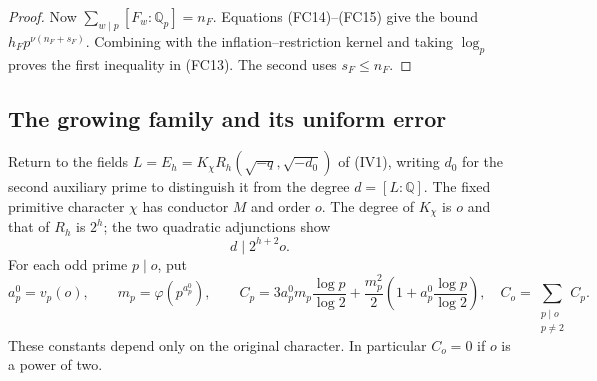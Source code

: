 \begin{proof}
Now $\sum_{w\mid p}[F_w:\mathbb Q_p]=n_F$.
Equations (FC14)--(FC15) give the bound
$h_Fp^{\nu(n_F+s_F)}$. Combining with the
inflation--restriction kernel and taking $\log_p$
proves the first inequality in (FC13).
The second uses $s_F\le n_F$.
\end{proof}

\subsection{The growing family and its uniform error}

Return to the fields
$L=E_h=K_\chi R_h(\sqrt{-q},\sqrt{-d_0})$
of (IV1), writing $d_0$ for the second auxiliary prime
to distinguish it from the degree $d=[L:\mathbb Q]$.
The fixed primitive character $\chi$ has conductor $M$
and order $o$. The degree of $K_\chi$ is $o$ and that of
$R_h$ is $2^h$; the two quadratic adjunctions show
\[
                            d\mid 2^{h+2}o.
                                                               \tag{FC16}
\]
For each odd prime $p\mid o$, put
\[
 a_p^0=v_p(o),\qquad m_p=\varphi(p^{a_p^0}),\qquad
 C_p=3a_p^0m_p\frac{\log p}{\log2}
       +\frac{m_p^2}{2}
                    \left(1+a_p^0\frac{\log p}{\log2}\right),
 \quad C_o=\sum_{\substack{p\mid o\\p\ne2}}C_p.
                                                               \tag{FC17}
\]
These constants depend only on the original character.
In particular $C_o=0$ if $o$ is a power of two.

